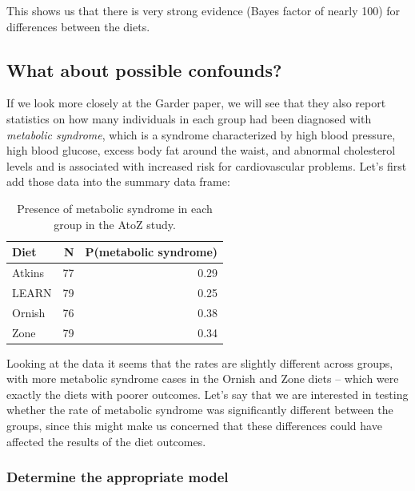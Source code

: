 \documentclass[12pt,]{book}
\theoremstyle{definition}
\theoremstyle{definition}
\theoremstyle{definition}
\theoremstyle{remark}
\begin{document}
This shows us that there is very strong evidence (Bayes factor of nearly 100) for differences between the diets.

\hypertarget{what-about-possible-confounds}{%
\subsection{What about possible confounds?}\label{what-about-possible-confounds}}

If we look more closely at the Garder paper, we will see that they also report statistics on how many individuals in each group had been diagnosed with \emph{metabolic syndrome}, which is a syndrome characterized by high blood pressure, high blood glucose, excess body fat around the waist, and abnormal cholesterol levels and is associated with increased risk for cardiovascular problems. Let's first add those data into the summary data frame:

\begin{table}

\caption{\label{tab:unnamed-chunk-134}Presence of metabolic syndrome in each group in the AtoZ study.}
\centering
\begin{tabular}[t]{l|r|r}
\hline
Diet & N & P(metabolic syndrome)\\
\hline
Atkins & 77 & 0.29\\
\hline
LEARN & 79 & 0.25\\
\hline
Ornish & 76 & 0.38\\
\hline
Zone & 79 & 0.34\\
\hline
\end{tabular}
\end{table}

Looking at the data it seems that the rates are slightly different across groups, with more metabolic syndrome cases in the Ornish and Zone diets -- which were exactly the diets with poorer outcomes. Let's say that we are interested in testing whether the rate of metabolic syndrome was significantly different between the groups, since this might make us concerned that these differences could have affected the results of the diet outcomes.

\hypertarget{determine-the-appropriate-model-1}{%
\subsubsection{Determine the appropriate model}\label{determine-the-appropriate-model-1}}
\end{document}
